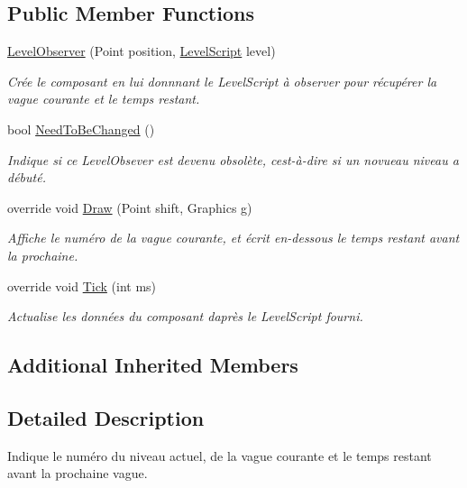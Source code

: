 \subsection*{Public Member Functions}
\begin{DoxyCompactItemize}
\item 
\hyperlink{class_tentacle_slicers_1_1hud_1_1_level_observer_a8e419210f3d16e19d0a1860c46c74863}{Level\+Observer} (Point position, \hyperlink{class_tentacle_slicers_1_1levels_1_1_level_script}{Level\+Script} level)
\begin{DoxyCompactList}\small\item\em Crée le composant en lui donnnant le Level\+Script à observer pour récupérer la vague courante et le temps restant. \end{DoxyCompactList}\item 
bool \hyperlink{class_tentacle_slicers_1_1hud_1_1_level_observer_a1acbdfbdd3aa51344506ebaf2460832e}{Need\+To\+Be\+Changed} ()
\begin{DoxyCompactList}\small\item\em Indique si ce Level\+Obsever est devenu obsolète, c\textquotesingle{}est-\/à-\/dire si un novueau niveau a débuté. \end{DoxyCompactList}\item 
override void \hyperlink{class_tentacle_slicers_1_1hud_1_1_level_observer_aa079c1eabd3ca45dbbd1d8b2b1d977f0}{Draw} (Point shift, Graphics g)
\begin{DoxyCompactList}\small\item\em Affiche le numéro de la vague courante, et écrit en-\/dessous le temps restant avant la prochaine. \end{DoxyCompactList}\item 
override void \hyperlink{class_tentacle_slicers_1_1hud_1_1_level_observer_a5dab8038fd2cf8a3ec165aaef11cfd73}{Tick} (int ms)
\begin{DoxyCompactList}\small\item\em Actualise les données du composant d\textquotesingle{}après le Level\+Script fourni. \end{DoxyCompactList}\end{DoxyCompactItemize}
\subsection*{Additional Inherited Members}


\subsection{Detailed Description}
Indique le numéro du niveau actuel, de la vague courante et le temps restant avant la prochaine vague. 



